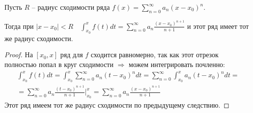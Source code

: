 \begin{theorem}
    Пусть $R$ -- радиус сходимости ряда $f(x) = \sum\limits_{n = 0}^\infty a_n(x - x_0)^n$.
    
    Тогда при $|x - x_0| < R \quad \int_{x_0}^x f(t)dt = \sum\limits_{n = 0}^\infty a_n \frac{(x - x_0)^{n+1}}{n+1}$ и этот ряд имеет тот же радиус сходимости.
\end{theorem}
\begin{proof}
    На $[x_0, x]$ ряд для $f$ сходится равномерно, так как этот отрезок полностью попал в круг сходимости $\Rightarrow$ можем интегрировать почленно:
    \begin{gather*}
        \int_{x_0}^x f(t)dt = \int_{x_0}^x \sum_{n=0}^\infty a_n(t - x_0)^n dt = \sum_{n=0}^\infty \int_{x_0}^x a_n(t - x_0)^n dt =  \\
        = \sum_{n = 0}^\infty a_n \frac{(t - x_0)^{n+1}}{n+1}\Big|_{x_0}^x = \sum_{n=0}^\infty a_n \frac{(x - x_0)^{n+1}}{n+1} 
    \end{gather*}
    Этот ряд имеем тот же радиус сходимости по предыдущему следствию.
\end{proof}
